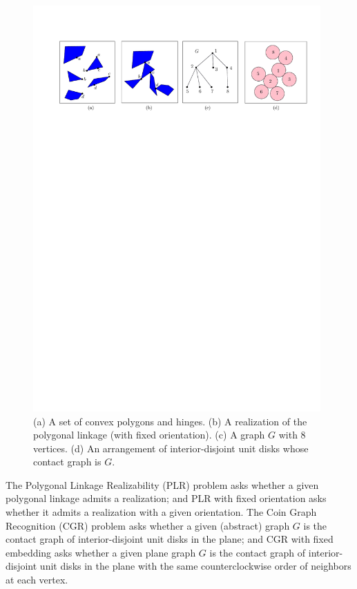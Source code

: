 \documentclass[runningheads]{article}
\begin{document}
\begin{figure}[htbp]
  \centering
 \includegraphics[width=0.98\textwidth]{fig1+}
\caption{\small (a) A set of convex polygons and hinges.
(b) A realization of the polygonal linkage (with fixed orientation).
(c) A graph $G$ with 8 vertices.
(d) An arrangement of interior-disjoint unit disks whose contact graph is $G$.}
\label{fig:1}
\end{figure}

\noindent
The {\sc Polygonal Linkage Realizability (PLR)} problem asks whether a given polygonal linkage admits a realization; and {\sc PLR with fixed orientation} asks whether it admits a realization with a given orientation. The {\sc Coin Graph Recognition (CGR)} problem asks whether a given (abstract) graph $G$ is the contact graph of interior-disjoint unit disks in the plane; and {\sc CGR with fixed embedding} asks whether a given plane graph $G$ is the contact graph of interior-disjoint unit disks in the plane with the same counterclockwise order of neighbors at each vertex.
\end{document}

